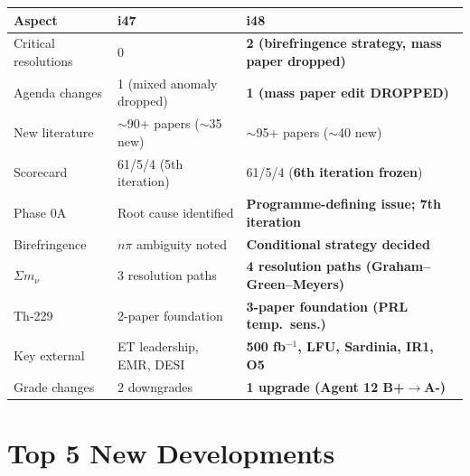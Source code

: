 \documentclass[11pt,a4paper]{article}
\begin{document}
\begin{center}
\begin{tabular}{lll}
\toprule
\textbf{Aspect} & \textbf{i47} & \textbf{i48} \\
\midrule
Critical resolutions & 0 & \textbf{2 (birefringence strategy, mass paper dropped)} \\
Agenda changes & 1 (mixed anomaly dropped) & \textbf{1 (mass paper edit DROPPED)} \\
New literature & $\sim$90+ papers ($\sim$35 new) & $\sim$95+ papers ($\sim$40 new) \\
Scorecard & 61/5/4 (5th iteration) & 61/5/4 (\textbf{6th iteration frozen}) \\
Phase 0A & Root cause identified & \textbf{Programme-defining issue; 7th iteration} \\
Birefringence & $n\pi$ ambiguity noted & \textbf{Conditional strategy decided} \\
$\Sigma m_\nu$ & 3 resolution paths & \textbf{4 resolution paths (Graham--Green--Meyers)} \\
Th-229 & 2-paper foundation & \textbf{3-paper foundation (PRL temp.\ sens.)} \\
Key external & ET leadership, EMR, DESI & \textbf{500 fb$^{-1}$, LFU, Sardinia, IR1, O5} \\
Grade changes & 2 downgrades & \textbf{1 upgrade (Agent 12 B+$\to$A-)} \\
\bottomrule
\end{tabular}
\end{center}

\section{Top 5 New Developments}
\end{document}
